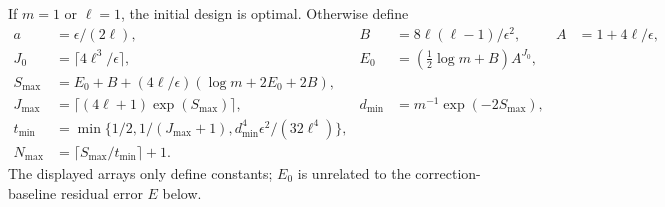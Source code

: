 \documentclass[11pt]{article}
\begin{document}
If $m=1$ or $\ell=1$, the initial design is optimal. Otherwise define
\begin{align*}
 a&=\epsilon/(2\ell),& B&=8\ell(\ell-1)/\epsilon^2,& A&=1+4\ell/\epsilon,\\
 J_0&=\lceil4\ell^3/\epsilon\rceil,&
 E_0&=(\tfrac12\log m+B)A^{J_0},\\
 S_{\max}&=E_0+B+(4\ell/\epsilon)(\log m+2E_0+2B),\\
 J_{\max}&=\lceil(4\ell+1)\exp(S_{\max})\rceil,&
 d_{\min}&=m^{-1}\exp(-2S_{\max}),\\
 t_{\min}&=\min\{1/2,1/(J_{\max}+1),d_{\min}^4\epsilon^2/(32\ell^4)\},\\
 N_{\max}&=\lceil S_{\max}/t_{\min}\rceil+1.
\end{align*}
The displayed arrays only define constants; $E_0$ is unrelated to the correction-baseline residual error $E$ below.
\end{document}
